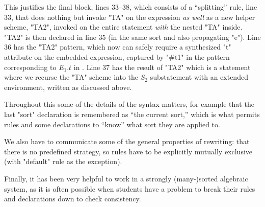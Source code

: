 \documentclass{article}
\begin{document}
\begin{enumerate}
    This justifies the final block, lines 33--38, which consists of a ``splitting'' rule, line 33,
    that does nothing but invoke "TA" on the expression \emph{as well} as a new helper scheme,
    "TA2", invoked on the entire statement \emph{with} the nested "TA" inside.  "TA2" is then
    declared in line 35 (in the same sort and also propagating "e"). Line 36 has the "TA2" pattern,
    which now can safely require a synthesized "t" attribute on the embedded expression, captured by
    "#t1" in the pattern corresponding to $E_1.t$ in . Line 37 has the result of "TA2"
    which is a statement where we recurse the "TA" scheme into the $S_2$ substatement with an
    extended environment, written as discussed above.

  \end{enumerate}

Throughout this some of the details of the \HAX syntax matters, for example that the last "sort"
declaration is remembered as ``the current sort,'' which is what permits rules and some declarations
to ``know'' what sort they are applied to.

We also have to communicate some of the general properties of rewriting: that there is no predefined
strategy, so rules have to be explicitly mutually exclusive (with "default" rule as the exception).

Finally, it has been very helpful to work in a strongly (many-)sorted algebraic system, as it is
often possible when students have a problem to break their rules and declarations down to check
consistency.
\end{document}
